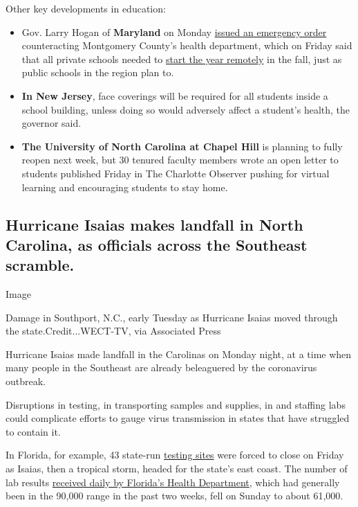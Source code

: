 Other key developments in education:

\begin{itemize}
\item
  Gov. Larry Hogan of \textbf{Maryland} on Monday
  \href{https://twitter.com/GovLarryHogan/status/1290330304830246912}{issued
  an emergency order} counteracting Montgomery County's health
  department, which on Friday said that all private schools needed to
  \href{https://www.washingtonpost.com/local/education/montgomery-county-health-officials-tell-private-schools-to-start-school-online/2020/08/01/64552b9e-d3fd-11ea-9038-af089b63ac21_story.html}{start
  the year remotely} in the fall, just as public schools in the region
  plan to.
\item
  \textbf{In New Jersey}, face coverings will be required for all
  students inside a school building, unless doing so would adversely
  affect a student's health, the governor said.
\item
  \textbf{The University of North Carolina at Chapel Hill} is planning
  to fully reopen next week, but 30 tenured faculty members wrote an
  open letter to students published Friday in The Charlotte Observer
  pushing for virtual learning and encouraging students to stay home.
\end{itemize}

\hypertarget{hurricane-isaias-makes-landfall-in-north-carolina-as-officials-across-the-southeast-scramble}{%
\subsection{Hurricane Isaias makes landfall in North Carolina, as
officials across the Southeast
scramble.}\label{hurricane-isaias-makes-landfall-in-north-carolina-as-officials-across-the-southeast-scramble}}

Image

Damage in Southport, N.C., early Tuesday as Hurricane Isaias moved
through the state.Credit...WECT-TV, via Associated Press

Hurricane Isaias made landfall in the Carolinas on Monday night, at a
time when many people in the Southeast are already beleaguered by the
coronavirus outbreak.

Disruptions in testing, in transporting samples and supplies, in and
staffing labs could complicate efforts to gauge virus transmission in
states that have struggled to contain it.

In Florida, for example, 43 state-run
\href{https://floridadisaster.org/covid19/testing-sites/}{testing sites}
were forced to close on Friday as Isaias, then a tropical storm, headed
for the state's east coast. The number of lab results
\href{http://ww11.doh.state.fl.us/comm/_partners/covid19_report_archive/state_reports_latest.pdf}{received
daily by Florida's Health Department}, which had generally been in the
90,000 range in the past two weeks, fell on Sunday to about 61,000.

